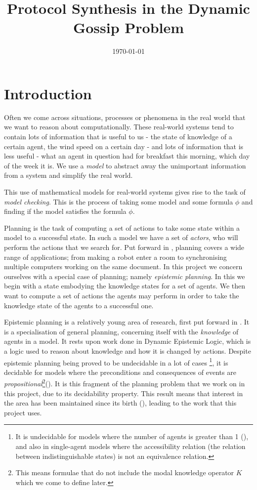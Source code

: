 \documentclass[10pt, a4paper]{report}
\title{Protocol Synthesis in the Dynamic Gossip Problem} %
\author{
	\authorstyle{Leo Poulson}
	\newline\newline %
}
\date{\today}
\begin{document}
\maketitle
\thispagestyle{firstpage}

\tableofcontents
\newpage

\chapter{Introduction}
\label{sec:Introduction}

Often we come across situations, processes or phenomena in the real world that
we want to reason about computationally. These real-world systems tend to
contain lots of information that is useful to us - the state of knowledge of a
certain agent, the wind speed on a certain day - and lots of information that is
less useful - what an agent in question had for breakfast this morning, which
day of the week it is. We use a \emph{model} to abstract away the unimportant
information from a system and simplify the real world. 

This use of mathematical models for real-world systems gives rise to the task of
\emph{model checking}. This is the process of taking some model  and some
formula $\phi$ and finding if the model  satisfies the formula $\phi$.

Planning is the task of computing a set of actions to take some state within a
model to a successful state. In such a model we have a set of \emph{actors}, who
will perform the actions that we search for. Put forward in
\cite{PlanningBook}, planning covers a wide range of applications; from making a
robot enter a room to synchronising multiple computers working on the same
document. In this project we concern ourselves with a special case of planning;
namely \emph{epistemic planning}. In this we begin with a state embodying the
knowledge states for a set of agents. We then want to compute a set of actions
the agents may perform in order to take the knowledge state of the agents to a
successful one.

Epistemic planning is a relatively young area of research, first put forward in
\cite{BolanderEP}. It is a specialisation of general planning, concerning itself
with the \emph{knowledge} of agents in a model. It rests upon work done in
Dynamic Epistemic Logic, which is a logic used to reason about knowledge and how
it is changed by actions. Despite epistemic planning being proved to be
undecidable in a lot of cases \footnote{It is undecidable for models where the
  number of agents is greater than 1 (\cite{UndecidabilityEP}), and also in
  single-agent models where the accessibility relation (the relation between
  indistinguishable states) is not an equivalence relation.}, it is decidable
for models where the preconditions and consequences of events are
\emph{propositional}\footnote{This means formulae that do not include the modal
  knowledge operator $K$ which we come to define later.}(\cite{DecidabilityEp}).
It is this fragment of the planning problem that we work on in this project, due
to its decidability property. This result means that interest in the area has
been maintained since its birth (\cite{AutomataTechniques}), leading to the work
that this project uses.
\end{document}
